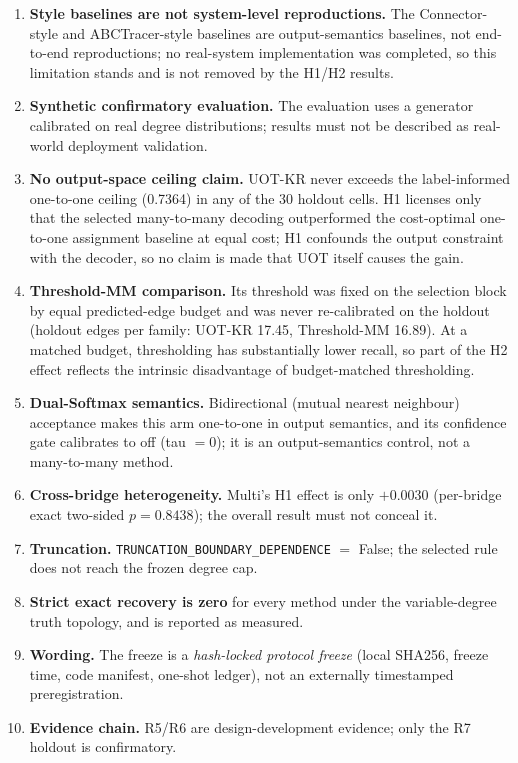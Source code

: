 \begin{enumerate}
  \item \textbf{Style baselines are not system-level reproductions.} The Connector-style
        and ABCTracer-style baselines are output-semantics baselines, not end-to-end
        reproductions; no real-system implementation was completed, so this limitation
        stands and is not removed by the H1/H2 results.
  \item \textbf{Synthetic confirmatory evaluation.} The evaluation uses a generator
        calibrated on real degree distributions; results must not be described as
        real-world deployment validation.
  \item \textbf{No output-space ceiling claim.} UOT-KR never exceeds the label-informed
        one-to-one ceiling (0.7364) in any of the 30 holdout cells.
        H1 licenses only that the selected many-to-many decoding outperformed the
        cost-optimal one-to-one assignment baseline at equal cost; H1 confounds the output
        constraint with the decoder, so no claim is made that UOT itself causes the gain.
  \item \textbf{Threshold-MM comparison.} Its threshold was fixed on the selection block by
        equal predicted-edge budget and was never re-calibrated on the holdout
        (holdout edges per family: UOT-KR
        17.45,
        Threshold-MM
        16.89).
        At a matched budget, thresholding has substantially lower recall, so part of the H2
        effect reflects the intrinsic disadvantage of budget-matched thresholding.
  \item \textbf{Dual-Softmax semantics.} Bidirectional (mutual nearest neighbour) acceptance
        makes this arm one-to-one in output semantics, and its confidence gate calibrates
        to off (tau $=0$); it is an output-semantics control, not a many-to-many method.
  \item \textbf{Cross-bridge heterogeneity.} Multi's H1 effect is only
        $+0.0030$ (per-bridge exact two-sided $p=0.8438$); the overall
        result must not conceal it.
  \item \textbf{Truncation.}
        \texttt{TRUNCATION\_BOUNDARY\_DEPENDENCE} $=$
        False;
        the selected rule does not reach the frozen degree cap.
  \item \textbf{Strict exact recovery is zero} for every method under the variable-degree
        truth topology, and is reported as measured.
  \item \textbf{Wording.} The freeze is a \emph{hash-locked protocol freeze} (local SHA256,
        freeze time, code manifest, one-shot ledger), not an externally timestamped
        preregistration.
  \item \textbf{Evidence chain.} R5/R6 are design-development evidence; only the R7 holdout
        is confirmatory.
\end{enumerate}
